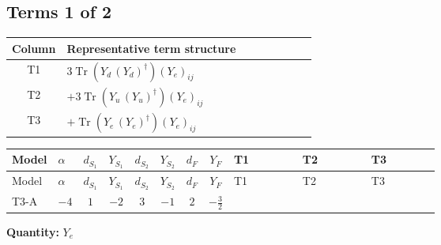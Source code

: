 \documentclass[8pt]{article}
\begin{document}
\begin{landscape}
\subsection*{Terms 1 of 2}
\begin{center}
\begin{tabular}{@{}c >{\raggedright\arraybackslash}p{0.82\linewidth}@{}}
\toprule
Column & Representative term structure \\
\midrule
T1 & \(\displaystyle 3 \operatorname{Tr}\!\left({Y_d}\,\left({Y_d}\right)^{\dagger}\right) \left({Y_e}\right)_{ij}\) \\
\midrule
T2 & \(\displaystyle +3 \operatorname{Tr}\!\left({Y_u}\,\left({Y_u}\right)^{\dagger}\right) \left({Y_e}\right)_{ij}\) \\
\midrule
T3 & \(\displaystyle +\operatorname{Tr}\!\left({Y_e}\,\left({Y_e}\right)^{\dagger}\right) \left({Y_e}\right)_{ij}\) \\
\midrule
\bottomrule
\end{tabular}
\end{center}
\smallskip
\tiny
\begin{longtable}{@{}llcccccc >{\raggedright\arraybackslash}p{0.21\linewidth} >{\raggedright\arraybackslash}p{0.21\linewidth} >{\raggedright\arraybackslash}p{0.21\linewidth}@{}}
\toprule
Model & $\alpha$ & $d_{S_1}$ & $Y_{S_1}$ & $d_{S_2}$ & $Y_{S_2}$ & $d_F$ & $Y_F$ & T1 & T2 & T3 \\
\midrule
\endfirsthead
\toprule
Model & $\alpha$ & $d_{S_1}$ & $Y_{S_1}$ & $d_{S_2}$ & $Y_{S_2}$ & $d_F$ & $Y_F$ & T1 & T2 & T3 \\
\midrule
\endhead
T3-A & $-4$ & $1$ & $-2$ & $3$ & $-1$ & $2$ & $-\frac{3}{2}$ & \scriptsize\adjustbox{max width=\linewidth}{$\begin{gathered} 3 \operatorname{Tr}\!\left({Y_d}\,\left({Y_d}\right)^{\dagger}\right) \left({Y_e}\right)_{ij}\end{gathered}$} & \scriptsize\adjustbox{max width=\linewidth}{$\begin{gathered} +3 \operatorname{Tr}\!\left({Y_u}\,\left({Y_u}\right)^{\dagger}\right) \left({Y_e}\right)_{ij}\end{gathered}$} & \scriptsize\adjustbox{max width=\linewidth}{$\begin{gathered} +\operatorname{Tr}\!\left({Y_e}\,\left({Y_e}\right)^{\dagger}\right) \left({Y_e}\right)_{ij}\end{gathered}$} \\
\midrule
\bottomrule
\end{longtable}
\clearpage
\noindent\textbf{Quantity: }$Y_e$\par\smallskip

\end{landscape}
\end{document}

